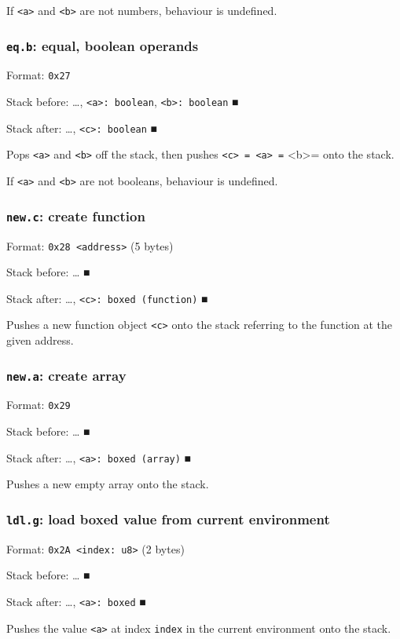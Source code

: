 \documentclass[11pt]{article}
\begin{document}
If \texttt{<a>} and \texttt{<b>} are not numbers, behaviour is undefined.

\subsubsection{\texttt{eq.b}: equal, boolean operands}
\label{sec:org73ca0ae}
Format: \texttt{0x27}

Stack before: \ldots{}​, \texttt{<a>: boolean}, \texttt{<b>: boolean} ■

Stack after: \ldots{}​, \texttt{<c>: boolean} ■

Pops \texttt{<a>} and \texttt{<b>} off the stack, then pushes \texttt{<c> = <a> =} <b>= onto
the stack.

If \texttt{<a>} and \texttt{<b>} are not booleans, behaviour is undefined.

\subsubsection{\texttt{new.c}: create function}
\label{sec:org1d41a06}
Format: \texttt{0x28 <address>} (5 bytes)

Stack before: \ldots{}​ ■

Stack after: \ldots{}​, \texttt{<c>: boxed (function)} ■

Pushes a new function object \texttt{<c>} onto the stack referring to the
function at the given address.

\subsubsection{\texttt{new.a}: create array}
\label{sec:orgcc2c694}
Format: \texttt{0x29}

Stack before: \ldots{}​ ■

Stack after: \ldots{}​, \texttt{<a>: boxed (array)} ■

Pushes a new empty array onto the stack.

\subsubsection{\texttt{ldl.g}: load boxed value from current environment}
\label{sec:orgbae78d9}
Format: \texttt{0x2A <index: u8>} (2 bytes)

Stack before: \ldots{}​ ■

Stack after: \ldots{}​, \texttt{<a>: boxed} ■

Pushes the value \texttt{<a>} at index \texttt{index} in the current environment onto
the stack.
\end{document}
